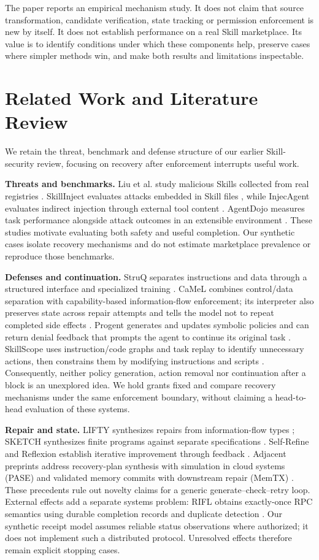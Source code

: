 \documentclass[conference]{IEEEtran}
\begin{document}
The paper reports an empirical mechanism study. It does not claim that source transformation, candidate verification, state tracking or permission enforcement is new by itself. It does not establish performance on a real Skill marketplace. Its value is to identify conditions under which these components help, preserve cases where simpler methods win, and make both results and limitations inspectable.

\section{Related Work and Literature Review}
We retain the threat, benchmark and defense structure of our earlier Skill-security review, focusing on recovery after enforcement interrupts useful work.

\textbf{Threats and benchmarks.}
Liu et al. study malicious Skills collected from real registries \cite{liu}. SkillInject evaluates attacks embedded in Skill files \cite{skillinject}, while InjecAgent evaluates indirect injection through external tool content \cite{injecagent}. AgentDojo measures task performance alongside attack outcomes in an extensible environment \cite{agentdojo}. These studies motivate evaluating both safety and useful completion. Our synthetic cases isolate recovery mechanisms and do not estimate marketplace prevalence or reproduce those benchmarks.

\textbf{Defenses and continuation.}
StruQ separates instructions and data through a structured interface and specialized training \cite{struq}. CaMeL combines control/data separation with capability-based information-flow enforcement; its interpreter also preserves state across repair attempts and tells the model not to repeat completed side effects \cite{camel}. Progent generates and updates symbolic policies and can return denial feedback that prompts the agent to continue its original task \cite{progent}. SkillScope uses instruction/code graphs and task replay to identify unnecessary actions, then constrains them by modifying instructions and scripts \cite{skillscope}. Consequently, neither policy generation, action removal nor continuation after a block is an unexplored idea. We hold grants fixed and compare recovery mechanisms under the same enforcement boundary, without claiming a head-to-head evaluation of these systems.

\textbf{Repair and state.}
LIFTY synthesizes repairs from information-flow types \cite{lifty}; SKETCH synthesizes finite programs against separate specifications \cite{sketch}. Self-Refine and Reflexion establish iterative improvement through feedback \cite{selfrefine,reflexion}. Adjacent preprints address recovery-plan synthesis with simulation in cloud systems (PASE) \cite{pase} and validated memory commits with downstream repair (MemTX) \cite{memtx}. These precedents rule out novelty claims for a generic generate--check--retry loop. External effects add a separate systems problem: RIFL obtains exactly-once RPC semantics using durable completion records and duplicate detection \cite{rifl}. Our synthetic receipt model assumes reliable status observations where authorized; it does not implement such a distributed protocol. Unresolved effects therefore remain explicit stopping cases.
\end{document}
